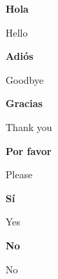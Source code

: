 \documentclass[avery5388,grid]{flashcards}
\begin{document}

\begin{flashcard}[Vocabulary]{\textbf{Hola}}
    \begin{center}
        Hello
    \end{center}
\end{flashcard}

\begin{flashcard}[Vocabulary]{\textbf{Adiós}}
    \begin{center}
        Goodbye
    \end{center}
\end{flashcard}

\begin{flashcard}[Vocabulary]{\textbf{Gracias}}
    \begin{center}
        Thank you
    \end{center}
\end{flashcard}

\begin{flashcard}[Vocabulary]{\textbf{Por favor}}
    \begin{center}
        Please
    \end{center}
\end{flashcard}

\begin{flashcard}[Vocabulary]{\textbf{Sí}}
    \begin{center}
        Yes
    \end{center}
\end{flashcard}

\begin{flashcard}[Vocabulary]{\textbf{No}}
    \begin{center}
        No
    \end{center}
\end{flashcard}
\end{document}
